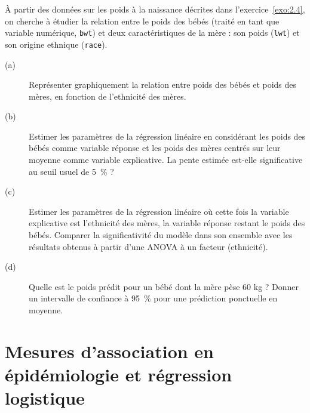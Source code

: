 \begin{exo}
À partir des données sur les poids à la naissance décrites dans
l'exercice~\ref{exo:2.4}, on cherche à étudier la relation entre le poids des
bébés (traité en tant que variable numérique, \texttt{bwt}) et deux
caractéristiques de la mère : son poids (\texttt{lwt}) et son origine
ethnique (\texttt{race}).
\begin{description}
\item[(a)] Représenter graphiquement la relation entre poids des bébés et
  poids des mères, en fonction de l'ethnicité des mères.
\item[(b)] Estimer les paramètres de la régression linéaire en considérant
  les poids des bébés comme variable réponse et les poids des mères centrés
  sur leur moyenne comme variable explicative. La pente estimée est-elle
  significative au seuil usuel de 5~\% ?
\item[(c)] Estimer les paramètres de la régression linéaire où cette fois la
  variable explicative est l'ethnicité des mères, la variable réponse
  restant le poids des bébés. Comparer la significativité du modèle dans son
  ensemble avec les résultats obtenus à partir d'une ANOVA à un facteur
  (ethnicité). 
\item[(d)] Quelle est le poids prédit pour un bébé dont la mère pèse 60 kg ?
  Donner un intervalle de confiance à 95~\% pour une prédiction ponctuelle
  en moyenne.
\end{description}
\end{exo}


\chapter{Mesures d'association en épidémiologie et régression
  logistique}\label{chap:logistic}

